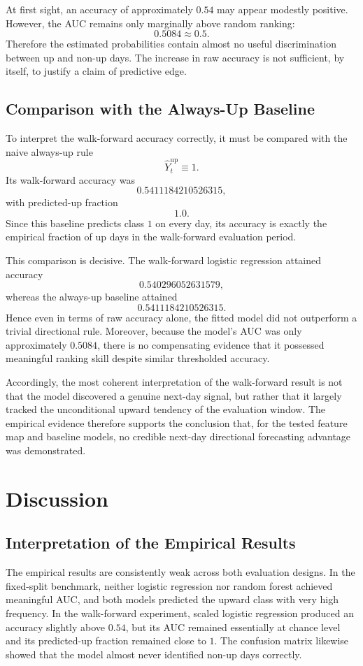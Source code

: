 \documentclass[11pt,a4paper]{article}
\begin{document}
	At first sight, an accuracy of approximately \(0.54\) may appear modestly positive. However, the AUC remains only marginally above random ranking:
	\[
	0.5084 \approx 0.5.
	\]
	Therefore the estimated probabilities contain almost no useful discrimination between up and non-up days. The increase in raw accuracy is not sufficient, by itself, to justify a claim of predictive edge.
	
	\subsection{Comparison with the Always-Up Baseline}
	
	To interpret the walk-forward accuracy correctly, it must be compared with the naive always-up rule
	\[
	\widehat{Y}_t^{\mathrm{up}} \equiv 1.
	\]
	Its walk-forward accuracy was
	\[
	0.5411184210526315,
	\]
	with predicted-up fraction
	\[
	1.0.
	\]
	Since this baseline predicts class \(1\) on every day, its accuracy is exactly the empirical fraction of up days in the walk-forward evaluation period.
	
	This comparison is decisive. The walk-forward logistic regression attained accuracy
	\[
	0.540296052631579,
	\]
	whereas the always-up baseline attained
	\[
	0.5411184210526315.
	\]
	Hence even in terms of raw accuracy alone, the fitted model did not outperform a trivial directional rule. Moreover, because the model's AUC was only approximately \(0.5084\), there is no compensating evidence that it possessed meaningful ranking skill despite similar thresholded accuracy.
	
	Accordingly, the most coherent interpretation of the walk-forward result is not that the model discovered a genuine next-day signal, but rather that it largely tracked the unconditional upward tendency of the evaluation window. The empirical evidence therefore supports the conclusion that, for the tested feature map and baseline models, no credible next-day directional forecasting advantage was demonstrated.
	
	\section{Discussion}
	
	\subsection{Interpretation of the Empirical Results}
	
	The empirical results are consistently weak across both evaluation designs. In the fixed-split benchmark, neither logistic regression nor random forest achieved meaningful AUC, and both models predicted the upward class with very high frequency. In the walk-forward experiment, scaled logistic regression produced an accuracy slightly above \(0.54\), but its AUC remained essentially at chance level and its predicted-up fraction remained close to \(1\). The confusion matrix likewise showed that the model almost never identified non-up days correctly.
	
\end{document}
